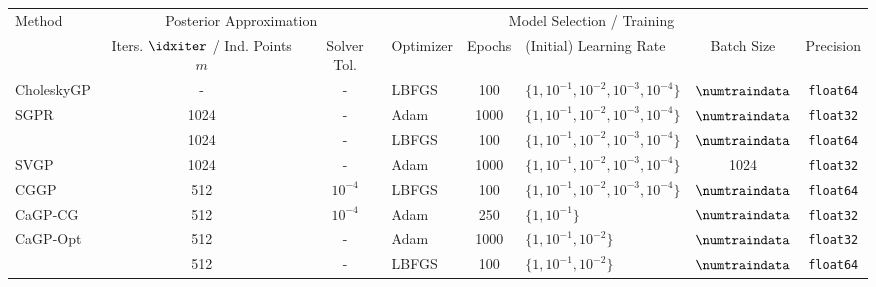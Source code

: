 \begin{tabular}{lcclclcc}
    \toprule
    \multirow{2}{*}{Method} & \multicolumn{2}{c}{Posterior Approximation} & \multicolumn{4}{c}{Model Selection / Training} &\\ 
    \cmidrule(lr){2-3} \cmidrule(lr){4-7}
    & Iters. \(\idxiter\) / Ind. Points \(m\) & Solver Tol. & Optimizer  & Epochs & (Initial) Learning Rate &  Batch Size & Precision \\
    \midrule
    \textcolor{CholeskyGP}{CholeskyGP} & - & - & LBFGS & 100 & \(\{1, 10^{-1}, 10^{-2}, 10^{-3}, 10^{-4}\}\) & \(\numtraindata\) & \texttt{float64}\\
    \textcolor{SGPR}{SGPR}& 1024 & - & Adam & 1000 & \(\{1, 10^{-1}, 10^{-2}, 10^{-3}, 10^{-4}\}\) & \(\numtraindata\) & \texttt{float32}\\
    &
    1024 & - & LBFGS & 100 & \(\{1, 10^{-1}, 10^{-2}, 10^{-3}, 10^{-4}\}\) & \(\numtraindata\) & \texttt{float64}\\
    \textcolor{SVGP}{SVGP}& 1024 & - & Adam & 1000 & \(\{1, 10^{-1}, 10^{-2}, 10^{-3}, 10^{-4}\}\) & 1024 & \texttt{float32}\\
    \textcolor{CGGP}{CGGP} & 512 & \(10^{-4}\) & LBFGS & 100 & \(\{1, 10^{-1}, 10^{-2}, 10^{-3}, 10^{-4}\}\) & \(\numtraindata\) & \texttt{float64}\\
    \textcolor{CaGP-CG}{CaGP-CG}& 512 & \(10^{-4}\) & Adam & 250 & \(\{1, 10^{-1}\}\) & \(\numtraindata\) & \texttt{float32}\\
    \textcolor{CaGP-Opt}{CaGP-Opt}& 512 & - & Adam & 1000 & \(\{1, 10^{-1}, 10^{-2}\}\) & \(\numtraindata\) & \texttt{float32}\\
    &
    512 & - & LBFGS & 100 & \(\{1, 10^{-1}, 10^{-2}\}\) & \(\numtraindata\) & \texttt{float64}\\
    \bottomrule
\end{tabular}